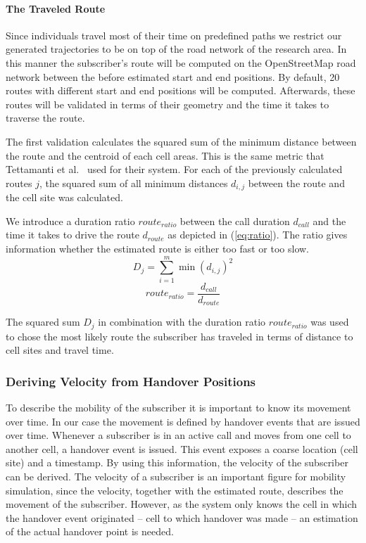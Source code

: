 \paragraph{The Traveled Route}
Since individuals travel most of their time on predefined paths we restrict our generated trajectories to be on top of the road network of the research area. In this manner the subscriber's route will be computed on the OpenStreetMap road network between the before estimated start and end positions. By default, 20 routes with different start and end positions will be computed. Afterwards, these routes will be validated in terms of their geometry and the time it takes to traverse the route.

The first validation calculates the squared sum of the minimum distance between the route and the centroid of each cell areas. This is the same metric that Tettamanti et al.~\cite{Tettamanti2012} used for their system. For each of the previously calculated routes $j$, the squared sum of all minimum distances $d_{i,j}$ between the
route and the cell site was calculated.

We introduce a duration ratio $route_{ratio}$ between the call duration $d_{call}$ and the time it takes to drive the route $d_{route}$ as depicted in (\ref{eq:ratio}). The ratio gives information whether the estimated route is either too fast or too slow. 
\begin{equation}
	D_j            =\sum_{i=1}^{m} \min(d_{i,j})^{2} \label{eq:sumsquaremine} 
\end{equation} 
\begin{equation}
	route_{ratio}  =\frac{d_{call}}{d_{route}} \label{eq:ratio}     
\end{equation} 
	         
The squared sum $D_j$ in combination with the duration ratio $route_{ratio}$ was used to chose the most likely route the subscriber has traveled in terms of distance to cell sites and travel time.
\subsubsection{Deriving Velocity from Handover Positions}
To describe the mobility of the subscriber it is important to know its movement over time. In our case the movement is defined by handover events that are issued over time. Whenever a subscriber is in an active call and moves from one cell to another cell, a handover event is issued. This event exposes a coarse location (cell site) and a timestamp. By using this information, the velocity of the subscriber can be derived. The velocity of a subscriber is an important figure for mobility simulation, since the velocity, together with the estimated route, describes the movement of the subscriber. However, as the system only knows the cell in which the handover event originated -- cell to which handover was made -- an estimation of the actual handover point is needed.
